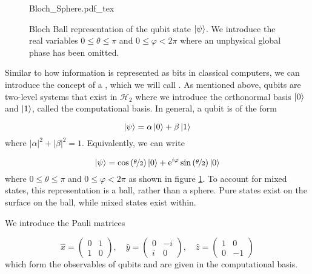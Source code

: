\begin{figure}
	\centering
	\def\svgwidth{0.4\textwidth}
   	{Bloch_Sphere.pdf_tex}
   	\caption[Bloch sphere representation of a qubit]{Bloch Ball representation of the qubit state $\ket{\psi}$. We introduce the real variables $0\le\theta\le\pi$ and $0\le\varphi<2\pi$ where an unphysical global phase has been omitted.}
   	\label{fig:bloch}
\end{figure}

Similar to how information is represented as bits in classical computers, we can introduce the concept of a , which we will call . As mentioned above, qubits are two-level systems that exist in $\mathcal{H}_2$ where we introduce the orthonormal basis $\ket{0}$ and $\ket{1}$, called the computational basis. In general, a qubit is of the form 

\begin{equation}
	\ket{\psi} = \alpha\ket{0} + \beta\ket{1}
\end{equation}
where $|\alpha|^2 + |\beta|^2 = 1$. Equivalently, we can write

\begin{equation}
	\ket{\psi} = \cos\left(\nicefrac{\theta}{2}\right)\ket{0} + \mathrm{e}^{i\varphi}\sin\left(\nicefrac{\theta}{2}\right)\ket{0}
\end{equation}
where $0\le\theta\le\pi$ and $0\le\varphi<2\pi$ as shown in figure \ref{fig:bloch}. To account for mixed states, this representation is a ball, rather than a sphere. Pure states exist on the surface on the ball, while mixed states exist within.

We introduce the Pauli matrices

\begin{equation}
	\hat{x} = \left(\begin{matrix}
		0 & 1 \\
		1 & 0
	\end{matrix}\right),
	\quad
	\hat{y} = \left(\begin{matrix}
		0 & -i \\
		i & 0
	\end{matrix}\right),
	\quad
	\hat{z} = \left(\begin{matrix}
		1 & 0 \\
		0 & -1
	\end{matrix}\right)
\end{equation}
which form the observables of qubits and are given in the computational basis. 

